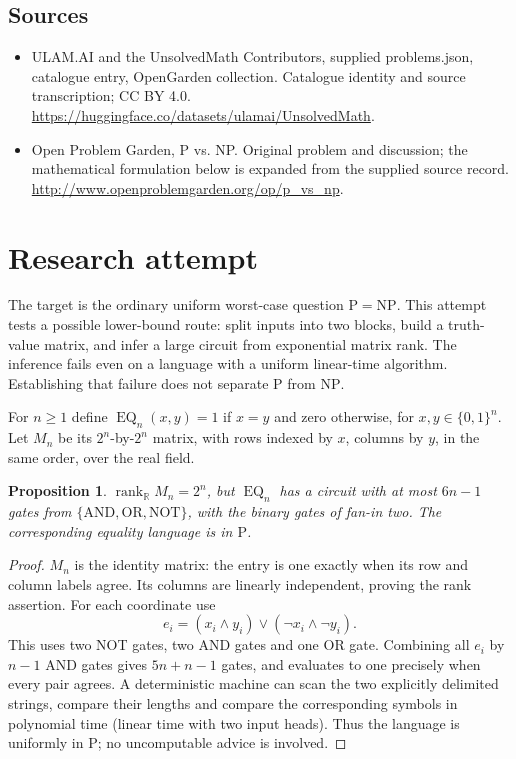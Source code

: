 \documentclass[11pt,a4paper]{article}
\newtheorem{proposition}{Proposition}
\begin{document}
\subsection{Sources}
\begin{itemize}
\item[S1] ULAM.AI and the UnsolvedMath Contributors, supplied problems.json, catalogue entry, OpenGarden collection. Catalogue identity and source transcription; CC BY 4.0.
\url{https://huggingface.co/datasets/ulamai/UnsolvedMath}.
\item[S2] Open Problem Garden, P vs. NP. Original problem and discussion; the mathematical formulation below is expanded from the supplied source record.
\url{http://www.openproblemgarden.org/op/p_vs_np}.
\end{itemize}


\section{Research attempt}
The target is the ordinary uniform worst-case question $\mathrm P=\mathrm{NP}$. This attempt tests a possible lower-bound route: split inputs into two blocks, build a truth-value matrix, and infer a large circuit from exponential matrix rank. The inference fails even on a language with a uniform linear-time algorithm. Establishing that failure does not separate $\mathrm P$ from $\mathrm{NP}$.

For $n\ge1$ define $\operatorname{EQ}_n(x,y)=1$ if $x=y$ and zero otherwise, for $x,y\in\{0,1\}^n$. Let $M_n$ be its $2^n$-by-$2^n$ matrix, with rows indexed by $x$, columns by $y$, in the same order, over the real field.

\begin{proposition}
$\operatorname{rank}_{\mathbb R}M_n=2^n$, but $\operatorname{EQ}_n$ has a circuit with at most $6n-1$ gates from $\{\mathrm{AND},\mathrm{OR},\mathrm{NOT}\}$, with the binary gates of fan-in two. The corresponding equality language is in $\mathrm P$.
\end{proposition}
\begin{proof}
$M_n$ is the identity matrix: the entry is one exactly when its row and column labels agree. Its columns are linearly independent, proving the rank assertion. For each coordinate use
\[
 e_i=(x_i\wedge y_i)\vee(\neg x_i\wedge\neg y_i).
\]
This uses two NOT gates, two AND gates and one OR gate. Combining all $e_i$ by $n-1$ AND gates gives $5n+n-1$ gates, and evaluates to one precisely when every pair agrees. A deterministic machine can scan the two explicitly delimited strings, compare their lengths and compare the corresponding symbols in polynomial time (linear time with two input heads). Thus the language is uniformly in $\mathrm P$; no uncomputable advice is involved.
\end{proof}
\end{document}
